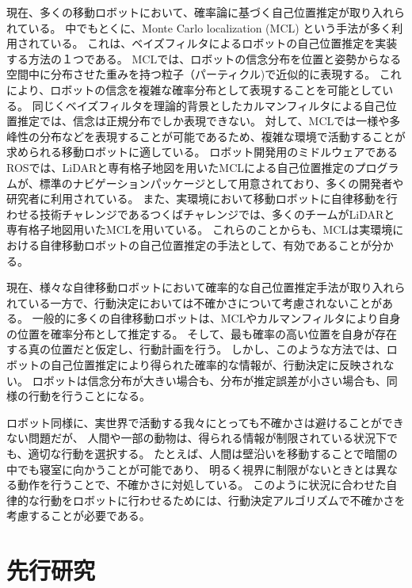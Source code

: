 現在、多くの移動ロボットにおいて、確率論に基づく自己位置推定が取り入れられている。
中でもとくに、Monte Carlo localization (MCL) という手法が多く利用されている\cite{dellaert1999, fox1999}。
これは、ベイズフィルタによるロボットの自己位置推定を実装する方法の１つである。
MCLでは、ロボットの信念分布を位置と姿勢からなる空間中に分布させた重みを持つ粒子（パーティクル)で近似的に表現する。
これにより、ロボットの信念を複雑な確率分布として表現することを可能としている。
同じくベイズフィルタを理論的背景としたカルマンフィルタによる自己位置推定では、信念は正規分布でしか表現できない\cite{kalman1960}。
対して、MCLでは一様や多峰性の分布などを表現することが可能であるため、複雑な環境で活動することが求められる移動ロボットに適している。
ロボット開発用のミドルウェアであるROSでは、LiDARと専有格子地図を用いたMCLによる自己位置推定のプログラムが、標準のナビゲーションパッケージとして用意されており、多くの開発者や研究者に利用されている\cite{quigley2009ros,roswiki_amcl}。
また、実環境において移動ロボットに自律移動を行わせる技術チャレンジであるつくばチャレンジでは、多くのチームがLiDARと専有格子地図用いたMCLを用いている。
\cite{夏迫2016つくばチャレンジ}
これらのことからも、MCLは実環境における自律移動ロボットの自己位置推定の手法として、有効であることが分かる。

現在、様々な自律移動ロボットにおいて確率的な自己位置推定手法が取り入れられている一方で、行動決定においては不確かさについて考慮されないことがある。
一般的に多くの自律移動ロボットは、MCLやカルマンフィルタにより自身の位置を確率分布として推定する。
そして、最も確率の高い位置を自身が存在する真の位置だと仮定し、行動計画を行う。
しかし、このような方法では、ロボットの自己位置推定により得られた確率的な情報が、行動決定に反映されない。
ロボットは信念分布が大きい場合も、分布が推定誤差が小さい場合も、同様の行動を行うことになる。

ロボット同様に、実世界で活動する我々にとっても不確かさは避けることができない問題だが、
人間や一部の動物は、得られる情報が制限されている状況下でも、適切な行動を選択する。
たとえば、人間は壁沿いを移動することで暗闇の中でも寝室に向かうことが可能であり、
明るく視界に制限がないときとは異なる動作を行うことで、不確かさに対処している。
このように状況に合わせた自律的な行動をロボットに行わせるためには、行動決定アルゴリズムで不確かさを考慮することが必要である。


\section{先行研究}

